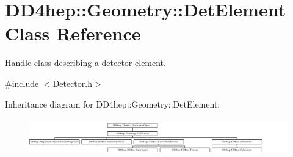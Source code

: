 \hypertarget{class_d_d4hep_1_1_geometry_1_1_det_element}{}\section{D\+D4hep\+:\+:Geometry\+:\+:Det\+Element Class Reference}
\label{class_d_d4hep_1_1_geometry_1_1_det_element}


\hyperlink{class_d_d4hep_1_1_handle}{Handle} class describing a detector element.  




{\ttfamily \#include $<$Detector.\+h$>$}

Inheritance diagram for D\+D4hep\+:\+:Geometry\+:\+:Det\+Element\+:\begin{figure}[H]
\begin{center}
\leavevmode
\includegraphics[height=1.611511cm]{class_d_d4hep_1_1_geometry_1_1_det_element}
\end{center}
\end{figure}
